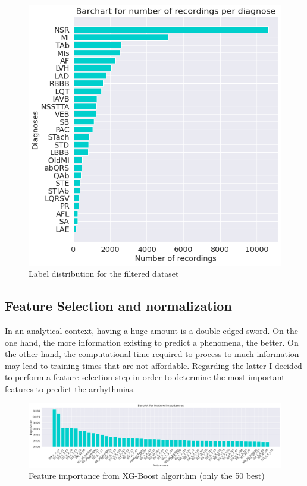 \begin{figure}[H]
\centering
\includegraphics[scale=0.32]{img/label_ditro_filtered.png}
\caption{Label distribution for the filtered dataset}
\label{fig:label_ditro_filtered}
\end{figure}

\subsection{Feature Selection and normalization}

In an analytical context, having a huge amount is a double-edged sword. On the one hand, the more information existing to predict a phenomena, the better. On the other hand, the computational time required to process to much information may lead to training times that are not affordable. Regarding the latter I decided to perform a feature selection step in order to determine the most important features to predict the arrhythmias. 

\begin{figure}[H]
\centering
\includegraphics[scale=0.23]{img/feature_importance.png}
\caption{Feature importance from XG-Boost algorithm (only the 50 best)}
\label{fig:feature_importance}
\end{figure}

